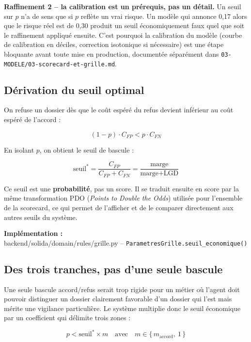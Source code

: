\documentclass[11pt,a4paper]{article}
\newcommand{\fichier}[1]{\noindent\textbf{Implémentation :} \\ \tiny\ttfamily#1\normalfont\normalsize\par}
\begin{document}
\textbf{Raffinement 2 -- la calibration est un prérequis, pas un détail.} Un seuil sur $p$ n'a de
sens que si $p$ reflète un vrai risque. Un modèle qui annonce 0,17 alors que le risque réel est de
0,30 produit un seuil économiquement faux quel que soit le raffinement appliqué ensuite. C'est
pourquoi la calibration du modèle (courbe de calibration en déciles, correction isotonique si
nécessaire) est une étape bloquante avant toute mise en production, documentée séparément dans
\texttt{03-MODELE/03-scorecard-et-grille.md}.

\subsection{Dérivation du seuil optimal}

On refuse un dossier dès que le coût espéré du refus devient inférieur au coût espéré de l'accord :

\begin{equation}
(1 - p) \cdot C_{FP} < p \cdot C_{FN}
\end{equation}

En isolant $p$, on obtient le seuil de bascule :

\begin{equation}
\text{seuil}^{*} = \frac{C_{FP}}{C_{FP} + C_{FN}} = \frac{\text{marge}}{\text{marge} + \text{LGD}}
\end{equation}

Ce seuil est une \textbf{probabilité}, pas un score. Il se traduit ensuite en score par la même
transformation PDO (\emph{Points to Double the Odds}) utilisée pour l'ensemble de la scorecard, ce
qui permet de l'afficher et de le comparer directement aux autres seuils du système.

\fichier{backend/solida/domain/rules/grille.py -- \texttt{ParametresGrille.seuil\_economique()}}

\subsection{Des trois tranches, pas d'une seule bascule}

Une seule bascule accord/refus serait trop rigide pour un métier où l'agent doit pouvoir
distinguer un dossier clairement favorable d'un dossier qui l'est mais mérite une vigilance
particulière. Le système multiplie donc le seuil économique par un coefficient qui délimite
trois zones :

\begin{equation}
p < \text{seuil}^{*} \times m
\quad\text{avec}\quad
m \in \{\,m_{\text{accord}},\ 1\,\}
\end{equation}
\end{document}
